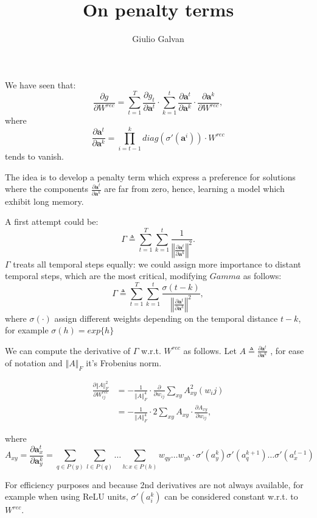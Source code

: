 \documentclass{article}
\title{On penalty terms}
\author{Giulio Galvan}
\renewcommand{\vec}[1]{\boldsymbol{#1}}
\newcommand{\mat}[1]{#1}
\newcommand{\norm}[1]{\left\Vert #1 \right\Vert}
\newcommand{\defeq}{\triangleq}
\begin{document}
	\maketitle

We have seen that:
\begin{equation}
	\frac{\partial g}{\partial \mat{W}^{rec}}= \sum_{t=1}^T\frac{\partial g_t}{\partial \vec{a}^t} \cdot \sum_{k=1}^t \frac{\partial \vec{a}^t}{\partial \vec{a}^k} \cdot \frac{\partial \vec{a}^k}{\partial \mat{W}^{rec}},
\end{equation}
where 
\begin{equation}
	\frac{\partial \vec{a}^t}{\partial \vec{a}^k} = \prod_{i=t-1}^{k}  diag(\sigma'(\vec{a}^i)) \cdot \mat{W}^{rec}
	\label{eq:temporalComponent}
\end{equation}
tends to vanish.

The idea is to develop a penalty term which express a preference for solutions where the components $\frac{\partial \vec{a}^t}{\partial \vec{a}^k}$ are far from zero, hence, learning a model which exhibit long memory.

A first attempt could be:
\begin{equation}
\Gamma \defeq \sum_{t=1}^T\sum_{k=1}^t \frac{1}{\norm{\frac{\partial \vec{a}^t}{\partial \vec{a}^k}}^2}.
\end{equation}
$\Gamma$ treats all temporal steps equally: we could assign more importance to distant temporal steps, which are the most critical, modifying $Gamma$ as follows:
\begin{equation}
\Gamma \defeq \sum_{t=1}^T\sum_{k=1}^t \frac{\sigma(t-k)}{\norm{\frac{\partial \vec{a}^t}{\partial \vec{a}^k}}^2},
\end{equation}
where $\sigma(\cdot)$ assign different weights depending on the temporal distance $t-k$, for example $\sigma(h)=exp\{h\}$

We can compute the derivative of $\Gamma$ w.r.t. $\mat{W}^{rec}$ as follows.
Let $A\defeq\frac{\partial \vec{a}^t}{\partial \vec{a}^k}$	, for ease of notation and $\norm{A}_F$ it's Frobenius norm.

\begin{align}
	\frac{\partial \norm{A}^2_F}{\partial \mat{W}_{ij}^{rec}}&=- \frac{1}{\norm{A}^4_F}\cdot \frac{\partial}{\partial w_{ij}} \sum_{xy} A_{xy}^2(w_ij)\\
	&=- \frac{1}{\norm{A}^4_F}\cdot 2\sum_{xy} A_{xy}\cdot \frac{\partial A_{xy}}{\partial w_{ij}},
\end{align}

where \begin{equation} 
A_{xy}=\frac{\partial \vec{a}_x^t}{\partial \vec{a}_y^k} = \sum_{q\in P(y)} \sum_{l \in P(q)} \hdots \sum_{h : x \in P(h)} w_{qy} \hdots w_{yh} \cdot \sigma'(a_y^k)\sigma'(a_q^{k+1}) \hdots \sigma'(a_x^{t-1})
\label{expanded_mem}
\end{equation}

For efficiency purposes and because 2nd derivatives are not always available, for example when using ReLU units, $\sigma'(a_i^k)$ can be considered constant w.r.t. to $\mat{W^{rec}}$.
\end{document}
